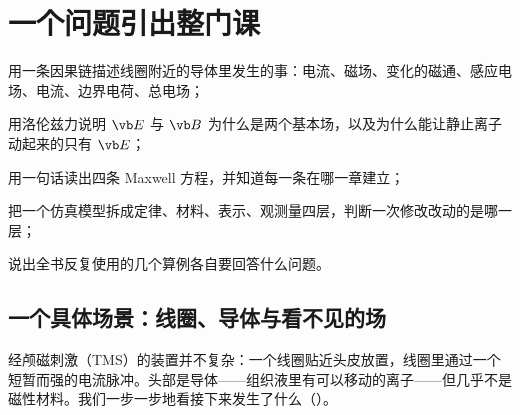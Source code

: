 \chapter{一个问题引出整门课}\label{ch:intro}

\begin{chapterguide}
\begin{guidegoals}
\item 用一条因果链描述线圈附近的导体里发生的事：电流、磁场、变化的磁通、感应电场、电流、边界电荷、总电场；
\item 用洛伦兹力说明 $\vb E$ 与 $\vb B$ 为什么是两个基本场，以及为什么能让静止离子动起来的只有 $\vb E$；
\item 用一句话读出四条 Maxwell 方程，并知道每一条在哪一章建立；
\item 把一个仿真模型拆成定律、材料、表示、观测量四层，判断一次修改改动的是哪一层；
\item 说出全书反复使用的几个算例各自要回答什么问题。
\end{guidegoals}
\end{chapterguide}

\section{一个具体场景：线圈、导体与看不见的场}\label{sec:intro-scene}

经颅磁刺激（TMS）的装置并不复杂：一个线圈贴近头皮放置，线圈里通过一个短暂而强的电流脉冲。头部是导体——组织液里有可以移动的离子——但几乎不是磁性材料。我们一步一步地看接下来发生了什么（）。


